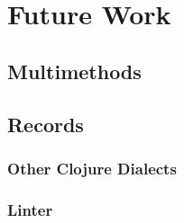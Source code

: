 \chapter{Future Work}

\section{Multimethods}

\section{Records}

\subsection{Other Clojure Dialects}

\subsection{Linter}
